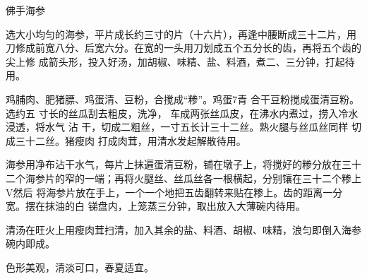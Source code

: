 \begin{recipe}{佛手海参}

\ingredients


\preparation

\step 选大小均匀的海参，平片成长约三寸的片（十六片），再逢中腰断成三十二片，用
刀修成前宽八分、后宽六分。在宽的一头用刀划成五个五分长的齿，再将五个齿的尖上修
成箭头形，投入好汤，加胡椒、味精、盐、料酒，煮二、三分钟，打起待用。

鸡脯肉、肥猪膘、鸡蛋清、豆粉，合搅成“糁”。鸡蛋7青 合干豆粉搅成蛋清豆粉。选约五
寸长的丝瓜刮去粗皮，洗净， 车成两张丝瓜皮，在沸水内煮过，捞入冷水浸透，将水气
沾 干，切成二粗丝，一寸五长计三十二丝。熟火腿与丝瓜丝同样 切成三十二丝。猪瘦肉
打成肉茸，用清水发起解散待用。

\step 海参用净布沾干水气，每片上抹遍蛋清豆粉，铺在墩子上，将搅好的糁分放在三十
二个海参片的窄的一端；再将火腿丝、丝瓜丝各一根横起，分别镶在三十二个糁上V然后
将海参片放在手上，一个一个地把五齿翻转来贴在糁上。齿的距离一分宽。摆在抹油的白
锑盘内，上笼蒸三分钟，取出放入大薄碗内待用。

\step 清汤在旺火上用瘦肉茸扫清，加入其余的盐、料酒、胡椒、味精，浪匀即倒入海参
碗内即成。

\features

色形美观，清淡可口，春夏适宜。

\end{recipe}

